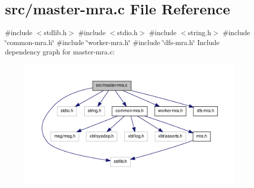 \hypertarget{master-mra_8c}{\section{src/master-\/mra.c \-File \-Reference}
\label{master-mra_8c}
}
{\ttfamily \#include $<$stdlib.\-h$>$}\*
{\ttfamily \#include $<$stdio.\-h$>$}\*
{\ttfamily \#include $<$string.\-h$>$}\*
{\ttfamily \#include \char`\"{}common-\/mra.\-h\char`\"{}}\*
{\ttfamily \#include \char`\"{}worker-\/mra.\-h\char`\"{}}\*
{\ttfamily \#include \char`\"{}dfs-\/mra.\-h\char`\"{}}\*
\-Include dependency graph for master-\/mra.c\-:\nopagebreak
\begin{figure}[H]
\begin{center}
\leavevmode
\includegraphics[width=350pt]{master-mra_8c__incl}
\end{center}
\end{figure}
